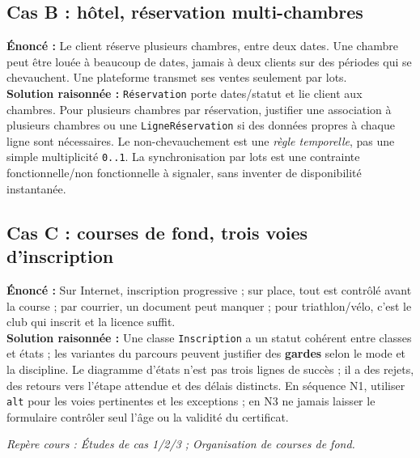 \documentclass[10pt,a4paper]{article}
\newcommand{\source}[1]{\par{\footnotesize\color{bodygray}\textit{Repère cours : #1}}}
\begin{document}
\subsection{Cas B : hôtel, réservation multi-chambres}
\textbf{Énoncé :} Le client réserve plusieurs chambres, entre deux dates. Une chambre peut être louée à beaucoup de dates, jamais à deux clients sur des périodes qui se chevauchent. Une plateforme transmet ses ventes seulement par lots.\\
\textbf{Solution raisonnée :} \texttt{Réservation} porte dates/statut et lie client aux chambres. Pour plusieurs chambres par réservation, justifier une association à plusieurs chambres ou une \texttt{LigneRéservation} si des données propres à chaque ligne sont nécessaires. Le non-chevauchement est une \emph{règle temporelle}, pas une simple multiplicité \texttt{0..1}. La synchronisation par lots est une contrainte fonctionnelle/non fonctionnelle à signaler, sans inventer de disponibilité instantanée.

\subsection{Cas C : courses de fond, trois voies d'inscription}
\textbf{Énoncé :} Sur Internet, inscription progressive ; sur place, tout est contrôlé avant la course ; par courrier, un document peut manquer ; pour triathlon/vélo, c'est le club qui inscrit et la licence suffit.\\
\textbf{Solution raisonnée :} Une classe \texttt{Inscription} a un statut cohérent entre classes et états ; les variantes du parcours peuvent justifier des \textbf{gardes} selon le mode et la discipline. Le diagramme d'états n'est pas trois lignes de succès ; il a des rejets, des retours vers l'étape attendue et des délais distincts. En séquence N1, utiliser \texttt{alt} pour les voies pertinentes et les exceptions ; en N3 ne jamais laisser le formulaire contrôler seul l'âge ou la validité du certificat.
\source{Études de cas 1/2/3 ; Organisation de courses de fond.}
\end{document}
